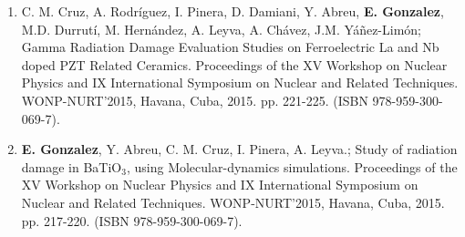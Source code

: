 \documentclass[10pt]{article}
\makeatletter
\newlength{\bibhang}
\newlength{\bibsep}
{\@listi \global\bibsep\itemsep \global\advance\bibsep by\parsep}
\newenvironment{bibsection}%
{\begin{enumerate}{}{%
			\setlength{\leftmargin}{\bibhang}%
			\setlength{\itemindent}{-\leftmargin}%
			\setlength{\itemsep}{\bibsep}%
			\setlength{\parsep}{\z@}%
			\setlength{\partopsep}{0pt}%
	\setlength{\topsep}{0pt}}}
{\end{enumerate}\vspace{-.6\baselineskip}}
\renewcommand{\section}[1]{\pagebreak[3]%
	\hyphenpenalty=10000%
	\vspace{1.3\baselineskip}%
	\phantomsection\addcontentsline{toc}{section}{#1}%
	\noindent\llap{\scshape\smash{\parbox[t]{\marginparwidth}{\raggedright #1}}}%
\vspace{-\baselineskip}\par}
\makeatother
\begin{document}
\begin{bibsection}
	\item C. M. Cruz, A. Rodr\'iguez, I. Pinera, D. Damiani,  Y. Abreu, {\bf E.
		Gonzalez}, M.D. Durrut\'i, M. Hern\'andez,  A. Leyva, A. Ch\'avez, J.M.
		Y\'a\~nez-Lim\'on; Gamma Radiation Damage Evaluation Studies on
		Ferroelectric La and Nb doped PZT Related Ceramics. Proceedings of the
		XV Workshop on Nuclear Physics and IX International Symposium on
		Nuclear and Related Techniques.  WONP-NURT'2015, Havana, Cuba, 2015.
		pp. 221-225. (ISBN 978-959-300-069-7).


	\item  {\bf E. Gonzalez}, Y. Abreu, C. M. Cruz, I. Pinera, A. Leyva.; Study
		of radiation damage in BaTiO$_3$, using Molecular-dynamics
		simulations. Proceedings of the XV Workshop on Nuclear Physics and
		IX International Symposium on Nuclear and Related Techniques.
		WONP-NURT'2015, Havana, Cuba, 2015. pp. 217-220. (ISBN
		978-959-300-069-7).



	\end{bibsection}



\end{document}
